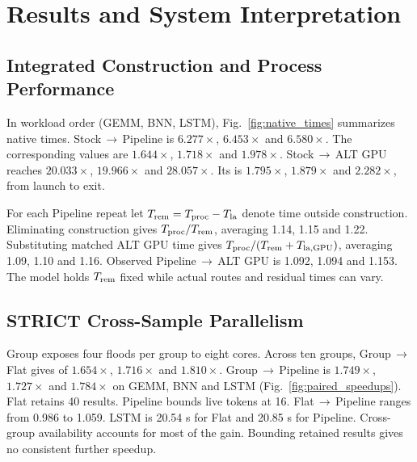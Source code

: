 \section{Results and System Interpretation}


\subsection{Integrated Construction and Process Performance}
In workload order (GEMM, BNN, LSTM), Fig.~\ref{fig:native_times} summarizes native times. Stock\,$\to$\,Pipeline \constructionspeedup{} is $6.277\times$, $6.453\times$ and $6.580\times$. The corresponding \processspeedup{} values are $1.644\times$, $1.718\times$ and $1.978\times$. Stock\,$\to$\,ALT GPU reaches $20.033\times$, $19.966\times$ and $28.057\times$. Its \processspeedup{} is $1.795\times$, $1.879\times$ and $2.282\times$, from launch to exit.

For each Pipeline repeat let $T_{\rm rem}=T_{\rm proc}-T_{\rm la}$ denote time outside construction. Eliminating construction gives $T_{\rm proc}/T_{\rm rem}$, averaging 1.14, 1.15 and 1.22. Substituting matched ALT GPU time gives $T_{\rm proc}/(T_{\rm rem}+T_{\rm la,GPU})$, averaging 1.09, 1.10 and 1.16. Observed Pipeline\,$\to$\,ALT GPU \processspeedup{} is 1.092, 1.094 and 1.153. The model holds $T_{\rm rem}$ fixed while actual routes and residual times can vary.
\subsection{STRICT Cross-Sample Parallelism}
Group exposes four floods per group to eight cores. Across ten groups, Group\,$\to$\,Flat gives \constructionspeedup{} of $1.654\times$, $1.716\times$ and $1.810\times$. Group\,$\to$\,Pipeline \constructionspeedup{} is $1.749\times$, $1.727\times$ and $1.784\times$ on GEMM, BNN and LSTM (Fig.~\ref{fig:paired_speedups}). Flat retains 40 results. Pipeline bounds live tokens at 16. Flat\,$\to$\,Pipeline \constructionspeedup{} ranges from 0.986 to 1.059. LSTM \constructiontime{} is 20.54 s for Flat and 20.85 s for Pipeline. Cross-group availability accounts for most of the gain. Bounding retained results gives no consistent further speedup.

